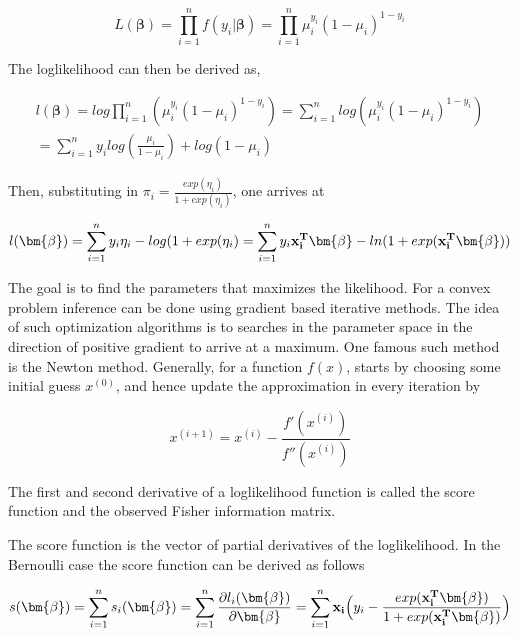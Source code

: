 \begin{equation}
    L(\bm{\beta}) = \prod_{i=1}^{n} f(y_i |\bm{ \beta}) = \prod_{i=1}^{n} \mu_i^{y_i}(1-\mu_i)^{1-y_i}
\end{equation}

The loglikelihood can then be derived as,

\begin{equation}
\begin{split}
    l(\bm{\beta}) = log \prod_{i=1}^{n} (\mu_i^{y_i}(1-\mu_i)^{1-y_i})  =
    \sum_{i=1}^n log (\mu_i^{y_i}(1-\mu_i)^{1-y_i})\\ =  \sum_{i=1}^{n} y_i log(\frac{\mu_i}{1-\mu_i}) + log(1-\mu_i)
\end{split}
\end{equation}

Then, substituting in $\pi_i = \frac{exp(\eta_i)}{1+exp(\eta_i)}$, one arrives at

\begin{equation}
    l(\bm{\beta}) = \sum_{i=1}^{n} y_i \eta_i - log(1 + exp(\eta_i) = \sum_{i=1}^n y_i{\bf x_i^T} \bm{ \beta} - ln(1 + exp(\bf x_i^T \bm{ \beta}))
\end{equation}

The goal is to find the parameters that maximizes the likelihood. For a convex problem inference can be done using gradient based iterative methods. The idea of such optimization algorithms is to searches in the parameter space in the direction of positive gradient to arrive at a maximum. One famous such method is the Newton method. Generally, for a function $f(x)$, starts by choosing some initial guess $x^{(0)}$, and hence update the approximation in every iteration by

\begin{equation}
    x^{(i+1)} = x^{(i)} - \frac{f'(x^{(i)})}{f''(x^{(i)})}
\end{equation}

The first and second derivative of a loglikelihood function is called the score function and the observed Fisher information matrix.

The score function is the vector of partial derivatives of the loglikelihood. In the Bernoulli case the score function can be derived as follows

\begin{equation}
\label{eq:score}
s(\bm{\beta}) = \sum_{i=1}^{n}s_i(\bm{\beta}) = \sum_{i=1}^{n} \frac{\partial l_i(\bm{\beta})}{\partial \bm{\beta}} = \sum_{i=1}^{n} {\bf x_i} \Big ( y_i - \frac{exp({\bf x_i^T} \bm{ \beta})}{1 + exp({\bf x_i^T} \bm{ \beta})}\Big )
\end{equation}


